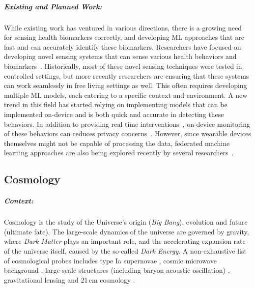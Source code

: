 \subparagraph*{Existing and Planned Work:} While existing work has ventured in various directions, there is a growing need for sensing health biomarkers correctly, and developing ML approaches that are fast and can accurately identify these biomarkers. Researchers have focused on developing novel sensing systems that can sense various  health behaviors and biomarkers~\cite{holz2017glabella,pham2020wake,chun2020intraoral,bui2019ebp,li2020noninvasive,echterhoff2020personal,bedri2020fitbyte}. Historically, most of these novel sensing techniques were tested in controlled settings, but more recently researchers are ensuring that these systems can work seamlessly in free living settings as well. This often requires developing multiple ML models, each catering to a specific context and environment. A new trend in this field has started relying on implementing models that can be implemented on-device and is both quick and accurate in detecting these behaviors. In addition to providing real time interventions~\cite{nahum2018just,thomas2015behavioral}, on-device monitoring of these behaviors can reduces privacy concerns~\cite{sadek2019privacy}. However, since wearable devices themselves might not be capable of processing the data, federated machine learning approaches are also being explored recently by several researchers~\cite{rieke2020future}.  


\subsection{Cosmology}

\subparagraph*{Context:} Cosmology is the study of the Universe's origin (\textit{Big Bang}), evolution and future (ultimate fate). The large-scale dynamics of the universe are governed by gravity, where \textit{Dark Matter} plays an important role, and the accelerating expansion rate of the universe itself, caused by the so-called \textit{Dark Energy}. A non-exhaustive list of cosmological probes includes type Ia supernovae \citep[][]{Riess_1998, Perlmutter_1999, Betoule_2014, Scolnic_2018, Abbott_2019}, cosmic microwave background \citep[][]{Fixsen_1996, Spergel_2003, Komatsu_2011, PC_2016, PC_2020}, large-scale structures (including baryon acoustic oscillation) \citep[][]{Eisenstein_2005, Percival_2010, Delubac_2015, Abbott_2019b}, gravitational lensing \citep[][]{Bacon_2000, Bacon_2003, Collett_2014, Suyu_2017, Heymans_2020} and 21\,cm cosmology \citep[][]{McQuinn_2007, Pritchard_2012, Maartens_2015, Beardsley_2016}.
    
